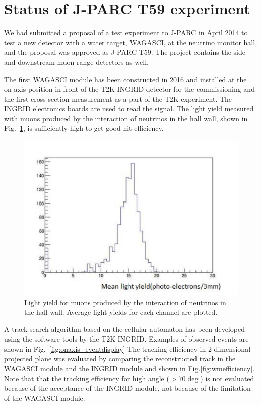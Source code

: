 \section{Status of J-PARC T59 experiment}

We had submitted a proposal of a test experiment to J-PARC in April 2014 to test a new detector with a water target, WAGASCI, at the neutrino monitor hall, and the proposal was approved as J-PARC T59.
The project contains the side and downstream muon range detectors as well.

The first WAGASCI module has been constructed in 2016 and installed at the on-axis position in front of the T2K INGRID detector for the commissioning and the first cross section measurement as a part of the T2K experiment.
The INGRID electronics boards are used to read the signal.
The light yield measured with muons produced by the interaction of neutrinos
in the hall wall, shown in Fig.~\ref{fig:wmlight}, is sufficiently high to get good hit efficiency.  
%
\begin{figure}[tbh]
\begin{center}
\includegraphics[width=0.5\linewidth]{fig/wmlight.pdf}
\end{center}
\caption{Light yield for muons produced by the interaction of neutrinos
  in the hall wall. Average light yields for each channel are plotted.
}
\label{fig:wmlight}
\end{figure}
A track search algorithm based on the cellular automaton has been developed using the software tools by the T2K INGRID. 
Examples of observed events are shown in Fig.~\ref{fig:onaxis_eventdisplay}
The tracking efficiency in 2-dimensional projected plane was evaluated by comparing the reconstructed track
in the WAGASCI module and the INGRID module and shown in Fig.\ref{fig:wmefficiency}.
Note that that the tracking efficiency for high angle ($>70\deg$) is not evaluated because of the acceptance
of the INGRID module, not because of the limitation of the WAGASCI module.
